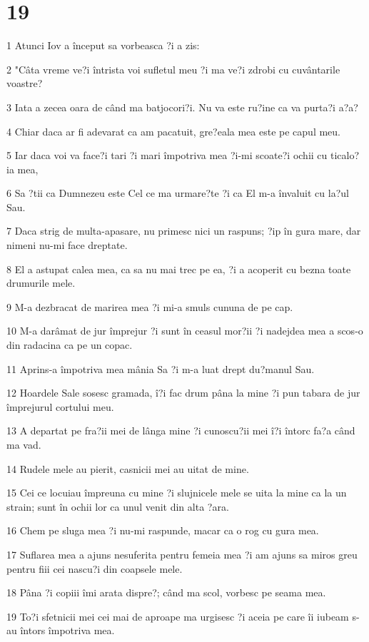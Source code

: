 \chapter{19}

\par 1 Atunci Iov a început sa vorbeasca ?i a zis:
\par 2 "Câta vreme ve?i întrista voi sufletul meu ?i ma ve?i zdrobi cu cuvântarile voastre?
\par 3 Iata a zecea oara de când ma batjocori?i. Nu va este ru?ine ca va purta?i a?a?
\par 4 Chiar daca ar fi adevarat ca am pacatuit, gre?eala mea este pe capul meu.
\par 5 Iar daca voi va face?i tari ?i mari împotriva mea ?i-mi scoate?i ochii cu ticalo?ia mea,
\par 6 Sa ?tii ca Dumnezeu este Cel ce ma urmare?te ?i ca El m-a învaluit cu la?ul Sau.
\par 7 Daca strig de multa-apasare, nu primesc nici un raspuns; ?ip în gura mare, dar nimeni nu-mi face dreptate.
\par 8 El a astupat calea mea, ca sa nu mai trec pe ea, ?i a acoperit cu bezna toate drumurile mele.
\par 9 M-a dezbracat de marirea mea ?i mi-a smuls cununa de pe cap.
\par 10 M-a darâmat de jur împrejur ?i sunt în ceasul mor?ii ?i nadejdea mea a scos-o din radacina ca pe un copac.
\par 11 Aprins-a împotriva mea mânia Sa ?i m-a luat drept du?manul Sau.
\par 12 Hoardele Sale sosesc gramada, î?i fac drum pâna la mine ?i pun tabara de jur împrejurul cortului meu.
\par 13 A departat pe fra?ii mei de lânga mine ?i cunoscu?ii mei î?i întorc fa?a când ma vad.
\par 14 Rudele mele au pierit, casnicii mei au uitat de mine.
\par 15 Cei ce locuiau împreuna cu mine ?i slujnicele mele se uita la mine ca la un strain; sunt în ochii lor ca unul venit din alta ?ara.
\par 16 Chem pe sluga mea ?i nu-mi raspunde, macar ca o rog cu gura mea.
\par 17 Suflarea mea a ajuns nesuferita pentru femeia mea ?i am ajuns sa miros greu pentru fiii cei nascu?i din coapsele mele.
\par 18 Pâna ?i copiii îmi arata dispre?; când ma scol, vorbesc pe seama mea.
\par 19 To?i sfetnicii mei cei mai de aproape ma urgisesc ?i aceia pe care îi iubeam s-au întors împotriva mea.
